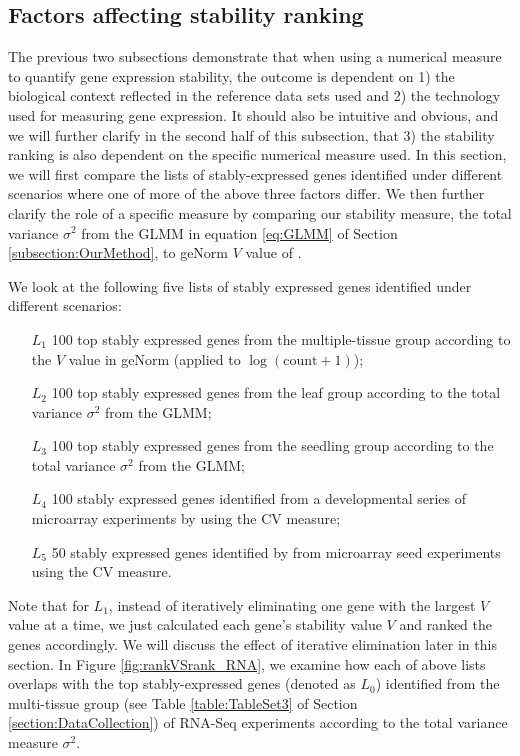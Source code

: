 \documentclass[11pt, a4paper]{article}
\begin{document}
\subsection{Factors affecting stability ranking}\label{section:stabilityMeasure}
The previous two subsections demonstrate that when using a numerical measure
to quantify gene expression stability, the outcome is dependent on 1) the
biological context reflected in the reference data sets used and 2) the
technology used for measuring gene expression. It should also be intuitive and
obvious, and we will further clarify in the second half of this subsection,
that 3) the stability ranking is also dependent on the specific numerical
measure used.  In this section, we will first compare the lists of
stably-expressed genes identified under different scenarios where one of more
of the above three factors differ.  We then further clarify the role of a
specific measure by comparing our stability measure, the total variance
$\sigma^2$ from the GLMM in equation \ref{eq:GLMM} of Section \ref{subsection:OurMethod}, to geNorm $V$ value of \cite{vandesompele2002accurate}. 

We look at the following five lists of stably expressed genes identified under
different scenarios: 
\begin{enumerate}
    \item[$L_1$]
 100 top stably expressed genes from the multiple-tissue group according
 to the $V$ value in geNorm (applied to $\log(\text{count}+1)$); 
\item[$L_2$]	
100 top stably expressed genes from the leaf group according to the total variance $\sigma^2$ from the GLMM; 
\item[$L_3$]
100 top stably expressed genes from the seedling group according to
the total variance $\sigma^2$ from the GLMM;
\item[$L_4$]
100 stably expressed genes identified from a developmental series of microarray
experiments by \cite{czechowski2005genome} using the CV measure; 
\item[$L_5$] 50 stably expressed genes identified by \cite{dekkers2012identification} from microarray
seed experiments using the CV measure.  
\end{enumerate}
 Note that for $L_1$,
 instead of iteratively eliminating one gene with the largest $V$ value at a
 time, we just calculated each gene's stability value $V$ and ranked the genes accordingly. We will discuss the
 effect of iterative elimination later in this section.  In Figure \ref{fig:rankVSrank_RNA}, %
we examine how each of above lists overlaps with the top stably-expressed
genes (denoted as $L_0$) identified from the multi-tissue group (see Table \ref{table:TableSet3} of Section \ref{section:DataCollection}) of RNA-Seq experiments
according to the total variance measure $\sigma^2$.
\end{document}
